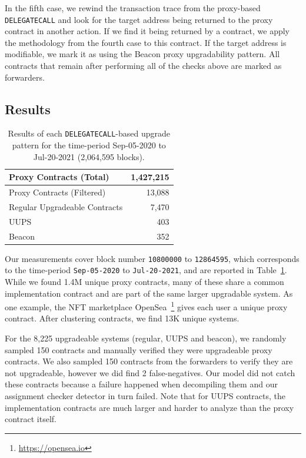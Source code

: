 In the fifth case, we rewind the transaction trace from the proxy-based \texttt{DELEGATECALL} and look for the target address being returned to the proxy contract in another action. If we find it being returned by a contract, we apply the methodology from the fourth case to this contract. If the target address is modifiable, we mark it as using the Beacon proxy upgradability pattern. All contracts that remain after performing all of the checks above are marked as forwarders. 

\subsection{Results}

\begin{table}[t]
\centering
\begin{tabular}{|l|r|}
\hline
Proxy Contracts (Total) & 1,427,215  \\ \hline 
Proxy Contracts (Filtered) & 13,088  \\ \hline 
Regular Upgradeable Contracts & 7,470  \\ \hline
UUPS & 403  \\ \hline
Beacon & 352  \\ \hline
\end{tabular}
\caption{\label{tab:updata} Results of each \texttt{DELEGATECALL}-based upgrade pattern for the time-period {Sep-05-2020} to {Jul-20-2021} (2,064,595 blocks).}
\vspace{-10pt}
\end{table}

Our measurements cover block number \texttt{10800000} to \texttt{12864595}, which corresponds to the time-period \texttt{Sep-05-2020} to \texttt{Jul-20-2021}, and are reported in Table~\ref{tab:updata}. While we found 1.4M unique proxy contracts, many of these share a common implementation contract and are part of the same larger upgradable system. As one example, the NFT marketplace OpenSea~\footnote{\url{https://opensea.io}} gives each user a unique proxy contract. After clustering contracts, we find 13K unique systems.  

For the 8,225 upgradeable systems (regular, UUPS and beacon), we randomly sampled 150 contracts and manually verified they were upgradeable proxy contracts. We also sampled 150 contracts from the forwarders to verify they are not upgradeable, however we did find 2 false-negatives. Our model did not catch these contracts because a failure happened when decompiling them and our assignment checker detector in turn failed. Note that for UUPS contracts, the implementation contracts are much larger and harder to analyze than the proxy contract itself.

